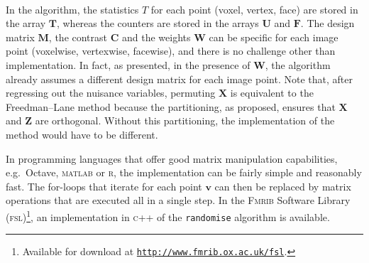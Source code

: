 {\begin{algorithmic}[1]
{
\State $\mathbf{U}[\mathbf{v}] \leftarrow \mathbf{U}[\mathbf{v}]+1$
\EndIf
\EndFor
\State $T^{\text{max}}_{\pi} \leftarrow \text{\textsf{max}}(\mathbf{T}_{\pi})$
\State $\mathbf{F}[\mathbf{v}] \leftarrow \mathbf{F}[\mathbf{v}]+1$
\EndIf
\EndFor
\EndFor
\State $p$-value $\leftarrow \mathbf{U} / \pi_{\#}$
\State $p_{\text{\textsc{fwer}}}$-value $\leftarrow \mathbf{F} / \pi_{\#}$
\State \Return $p$-value, $p_{\text{\textsc{fwer}}}$-value.
\EndFor
\end{algorithmic}}
\noindent
\HRule\\
\doublespacing
\vspace{4mm}

In the algorithm, the statistics $T$ for each point (voxel, vertex, face) are stored in the array $\mathbf{T}$, whereas the counters are stored in the arrays $\mathbf{U}$ and $\mathbf{F}$. The design matrix $\mathbf{M}$, the contrast $\mathbf{C}$ and the weights $\mathbf{W}$ can be specific for each image point (voxelwise, vertexwise, facewise), and there is no challenge other than implementation. In fact, as presented, in the presence of $\mathbf{W}$, the algorithm already assumes a different design matrix for each image point. Note that, after regressing out the nuisance variables, permuting $\mathbf{X}$ is equivalent to the Freedman--Lane method because the partitioning, as proposed, ensures that $\mathbf{X}$ and $\mathbf{Z}$ are orthogonal. Without this partitioning, the implementation of the method would have to be different.

In programming languages that offer good matrix manipulation capabilities, e.g.\ Octave, \textsc{matlab} or \textsc{r}, the implementation can be fairly simple and reasonably fast. The for-loops that iterate for each point $\mathbf{v}$ can then be replaced by matrix operations that are executed all in a single step. In the \textsc{Fmrib} Software Library (\textsc{fsl})\footnote{Available for download at \href{http://www.fmrib.ox.ac.uk/fsl}{\texttt{http://www.fmrib.ox.ac.uk/fsl}}.}, an implementation in \textsc{c}++ of the \texttt{randomise} algorithm is available.

